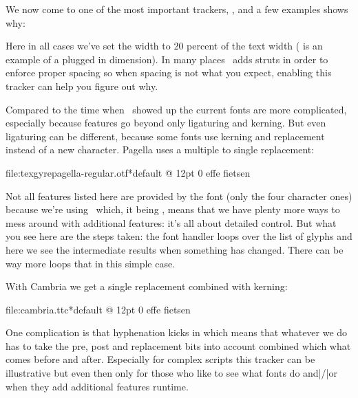 \starttyping
{}
\stoptyping

\stopsectionlevel

\startsectionlevel[title=Struts]

We now come to one of the most important trackers, \typ {\showstruts}, and a few
examples shows why:

\startlinecorrection
{} {}
  {\showstruts{}} {}
  {\showstruts{}} {}
  {\showstruts{}} {}
\stopcombination
\stoplinecorrection

Here in all cases we've set the width to 20 percent of the text width (
is an example of a plugged in dimension). In many places \CONTEXT\ adds struts in
order to enforce proper spacing so when spacing is not what you expect, enabling
this tracker can help you figure out why.

\stopsectionlevel

\startsectionlevel[title=Features]

Compared to the time when \TEX\ showed up the current fonts are more complicated,
especially because features go beyond only ligaturing and kerning. But even
ligaturing can be different, because some fonts use kerning and replacement
instead of a new character. Pagella uses a multiple to single replacement:

\blank \showotfcomposition
	{file:texgyrepagella-regular.otf*default @ 12pt}
	{0}
	{\nl effe fietsen}

Not all features listed here are provided by the font (only the four character
ones) because we're using \TEX\ which, it being \TEX, means that we have plenty
more ways to mess around with additional features: it's all about detailed
control. But what you see here are the steps taken: the font handler loops over
the list of glyphs and here we see the intermediate results when something has
changed. There can be way more loops that in this simple case.

With Cambria we get a single replacement combined with kerning:

\blank \showotfcomposition
	{file:cambria.ttc*default @ 12pt}
	{0}
	{\nl effe fietsen}

One complication is that hyphenation kicks in which means that whatever we do has
to take the pre, post and replacement bits into account combined which what comes
before and after. Especially for complex scripts this tracker can be illustrative
but even then only for those who like to see what fonts do and|/|or when they add
additional features runtime.

